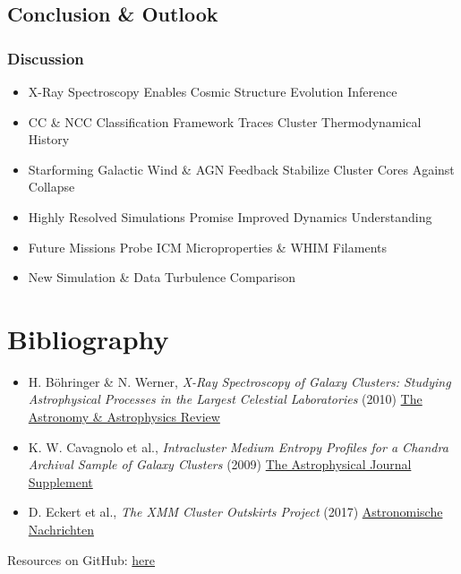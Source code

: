 
	\subsection{Conclusion \& Outlook}

	\begin{frame}
		\frametitle{Discussion}
		\begin{itemize}
			\item<2-> X-Ray Spectroscopy Enables Cosmic Structure Evolution Inference
			\item<3-> CC \& NCC Classification Framework Traces Cluster Thermodynamical History
			\item<4-> Starforming Galactic Wind \& AGN Feedback Stabilize Cluster Cores Against Collapse
			\item<5-> Highly Resolved Simulations Promise Improved Dynamics Understanding
			\item<6-> Future Missions Probe ICM Microproperties \& WHIM Filaments
			\item<7-> New Simulation \& Data Turbulence Comparison
		\end{itemize}
	\end{frame}

	\section{Bibliography}

	\begin{frame}
		\begin{center}\textcolor{MASS}{}\end{center}\vspace{3.5ex}
		\begin{itemize}
			\item H. Böhringer \& N. Werner, {\itshape{X-Ray Spectroscopy of Galaxy Clusters: Studying Astrophysical Processes
				  in the Largest Celestial Laboratories}} (2010)
				  \href{https://link.springer.com/article/10.1007/s00159-009-0023-3}{The Astronomy \& Astrophysics Review}
			\item K. W. Cavagnolo et al., {\itshape{Intracluster Medium Entropy Profiles for a Chandra Archival Sample of Galaxy Clusters}}
				  (2009) \href{https://iopscience.iop.org/article/10.1088/0067-0049/182/1/12}{The Astrophysical Journal Supplement}
			\item D. Eckert et al., {\itshape{The XMM Cluster Outskirts Project}} (2017)
				  \href{https://onlinelibrary.wiley.com/doi/10.1002/asna.201713345}{Astronomische Nachrichten}
		\end{itemize}
		\vspace{2.5ex}
		Resources on GitHub: \href{https://github.com/fritzali/notes/tree/main/MASS/Spectroscopy}{here}
	\end{frame}

